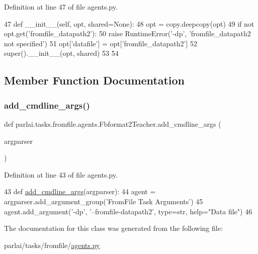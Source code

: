 Definition at line 47 of file agents.\+py.


\begin{DoxyCode}
47     \textcolor{keyword}{def }\_\_init\_\_(self, opt, shared=None):
48         opt = copy.deepcopy(opt)
49         \textcolor{keywordflow}{if} \textcolor{keywordflow}{not} opt.get(\textcolor{stringliteral}{'fromfile\_datapath2'}):
50             \textcolor{keywordflow}{raise} RuntimeError(\textcolor{stringliteral}{'-dp'}, \textcolor{stringliteral}{'fromfile\_datapath2 not specified'})
51         opt[\textcolor{stringliteral}{'datafile'}] = opt[\textcolor{stringliteral}{'fromfile\_datapath2'}]
52         super().\_\_init\_\_(opt, shared)
53 
54 
\end{DoxyCode}


\subsection{Member Function Documentation}
\mbox{\label{classparlai_1_1tasks_1_1fromfile_1_1agents_1_1Fbformat2Teacher_a5ddf39912ed941a77cc787a6e2d6db9a}} 
\subsubsection{\texorpdfstring{add\+\_\+cmdline\+\_\+args()}{add\_cmdline\_args()}}
{\footnotesize\ttfamily def parlai.\+tasks.\+fromfile.\+agents.\+Fbformat2\+Teacher.\+add\+\_\+cmdline\+\_\+args (\begin{DoxyParamCaption}\item[{}]{argparser }\end{DoxyParamCaption})\hspace{0.3cm}{\ttfamily [static]}}



Definition at line 43 of file agents.\+py.


\begin{DoxyCode}
43     \textcolor{keyword}{def }\hyperlink{namespaceparlai_1_1agents_1_1drqa_1_1config_a62fdd5554f1da6be0cba185271058320}{add\_cmdline\_args}(argparser):
44         agent = argparser.add\_argument\_group(\textcolor{stringliteral}{'FromFile Task Arguments'})
45         agent.add\_argument(\textcolor{stringliteral}{'-dp'}, \textcolor{stringliteral}{'--fromfile-datapath2'}, type=str, help=\textcolor{stringliteral}{"Data file"})
46 
\end{DoxyCode}


The documentation for this class was generated from the following file\+:\begin{DoxyCompactItemize}
\item 
parlai/tasks/fromfile/\hyperlink{parlai_2tasks_2fromfile_2agents_8py}{agents.\+py}\end{DoxyCompactItemize}
